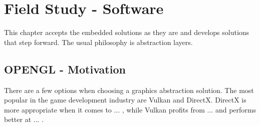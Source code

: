 


\chapter*{Field Study - Software}
    This chapter accepts the embedded solutions as they are and develops solutions that step forward. 
    The usual philosophy is abstraction layers.

    \section*{OPENGL - Motivation}
        There are a few options when choosing a graphics abstraction solution. The most popular in the game development industry are Vulkan and DirectX. DirectX is more appropriate when it comes to ... , while Vulkan profits from ... and performs better at ... .

